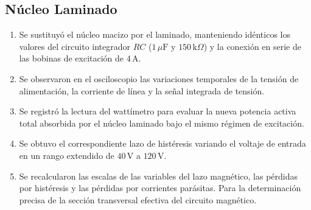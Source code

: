 \subsection{Núcleo Laminado}
\begin{enumerate}
    \item  Se sustituyó el núcleo macizo por el laminado, manteniendo idénticos los valores del circuito integrador $RC$ ($1\,\mu\text{F}$ y $150\,\text{k}\Omega$) y la conexión en serie de las bobinas de excitación de $4\,\text{A}$.
    
    \item Se observaron en el osciloscopio las variaciones temporales de la tensión de alimentación, la corriente de línea y la señal integrada de tensión.
    
    \item Se registró la lectura del wattímetro para evaluar la nueva potencia activa total absorbida por el núcleo laminado bajo el mismo régimen de excitación.
    
    \item  Se obtuvo el correspondiente lazo de histéresis variando el voltaje de entrada en un rango extendido de $40\,\text{V}$ a $120\,\text{V}$.
    
    \item Se recalcularon las escalas de las variables del lazo magnético, las pérdidas por histéresis y las pérdidas por corrientes parásitas. Para la determinación precisa de la sección transversal efectiva del circuito magnético.
\end{enumerate}